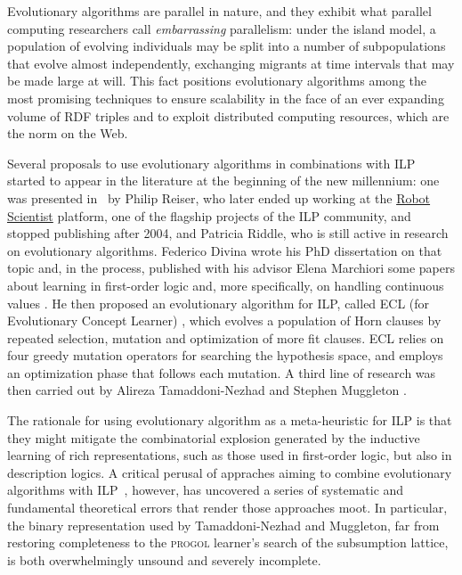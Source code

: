 \documentclass[a4paper]{article}
\newcounter{ex}
\begin{document}
Evolutionary algorithms are parallel in nature, and they exhibit what parallel
computing researchers call \emph{embarrassing} parallelism: under the island model,
a population of evolving individuals may be split into a number of subpopulations
that evolve almost independently, exchanging migrants at time intervals that may be
made large at will. This fact positions evolutionary algorithms among the most
promising techniques to ensure scalability in the face of an ever expanding volume
of RDF triples and to exploit distributed computing resources, which are the norm
on the Web.

Several proposals to use evolutionary algorithms in combinations with ILP started
to appear in the literature at the beginning of the new millennium:
one was presented in~\cite{ReiserRiddle2001} by Philip Reiser, who later ended up working at the
\href{http://en.wikipedia.org/wiki/Robot_Scientist}{Robot Scientist}
platform, one of the flagship projects of the ILP community, and stopped publishing after 2004,
and Patricia Riddle, who is still active in research on evolutionary algorithms.
Federico Divina wrote his PhD dissertation \cite{Divina2004th} on that topic and,
in the process, published with his advisor Elena Marchiori some papers about
learning in first-order logic \cite{DivinaMarchiori2001,DivinaMarchiori2002}
and, more specifically, on handling continuous values \cite{DivinaMarchiori2005}.
He then proposed an evolutionary algorithm for ILP, called ECL
(for Evolutionary Concept Learner) \cite{Divina2010}, which evolves a population of
Horn clauses by repeated selection, mutation and optimization of more fit clauses.
ECL relies on four greedy mutation operators for searching the hypothesis space,
and employs an optimization phase that follows each mutation.
A third line of research was then carried out by Alireza Tamaddoni-Nezhad and
Stephen Muggleton
\cite{TamaddoniNezhadMuggleton2000,TamaddoniNezhadMuggleton2002,TamaddoniNezhadMuggleton2008}.

The rationale for using evolutionary algorithm as a meta-heuristic for ILP is that
they might mitigate the combinatorial explosion generated by the inductive learning
of rich representations, such as those used in first-order logic, but also in description logics.
A critical perusal of appraches aiming to combine evolutionary algorithms with
ILP~\cite{Marginean2003}, however, has uncovered a series of systematic and fundamental
theoretical errors that render those approaches moot. In particular, the binary
representation used by Tamaddoni-Nezhad and Muggleton, far from restoring completeness
to the \textsc{progol} learner's search of the subsumption lattice, is both overwhelmingly
unsound and severely incomplete.
\end{document}
